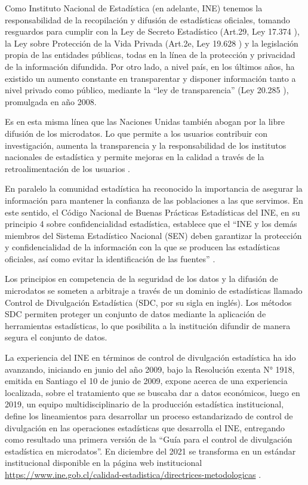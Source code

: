 \documentclass[
]{book}
\theoremstyle{definition}
\theoremstyle{definition}
\theoremstyle{definition}
\theoremstyle{definition}
\theoremstyle{remark}
\begin{document}
Como Instituto Nacional de Estadística (en adelante, INE) tenemos la responsabilidad de la recopilación y difusión de estadísticas oficiales, tomando resguardos para cumplir con la Ley de Secreto Estadístico (Art.29, Ley 17.374 \citep{ley1970}), la Ley sobre Protección de la Vida Privada (Art.2e, Ley 19.628 \citep{ley1999}) y la legislación propia de las entidades públicas, todas en la línea de la protección y privacidad de la información difundida. Por otro lado, a nivel país, en los últimos años, ha existido un aumento constante en transparentar y disponer información tanto a nivel privado como público, mediante la ``ley de transparencia'' (Ley 20.285 \citep{ley2008}), promulgada en año 2008.

Es en esta misma línea que las Naciones Unidas también abogan por la libre difusión de los microdatos. Lo que permite a los usuarios contribuir con investigación, aumenta la transparencia y la responsabilidad de los institutos nacionales de estadística y permite mejoras en la calidad a través de la retroalimentación de los usuarios \citep{nacionesunidas}.

En paralelo la comunidad estadística ha reconocido la importancia de asegurar la información para mantener la confianza de las poblaciones a las que servimos. En este sentido, el Código Nacional de Buenas Prácticas Estadísticas del INE, en su principio 4 sobre confidencialidad estadística, establece que el ``INE y los demás miembros del Sistema Estadístico Nacional (SEN) deben garantizar la protección y confidencialidad de la información con la que se producen las estadísticas oficiales, así como evitar la identificación de las fuentes'' \citep{institutonacionaldeestadisticas2015}.

Los principios en competencia de la seguridad de los datos y la difusión de microdatos se someten a arbitraje a través de un dominio de estadísticas llamado Control de Divulgación Estadística (SDC, por su sigla en inglés). Los métodos SDC permiten proteger un conjunto de datos mediante la aplicación de herramientas estadísticas, lo que posibilita a la institución difundir de manera segura el conjunto de datos.

La experiencia del INE en términos de control de divulgación estadística ha ido avanzando, iniciando en junio del año 2009, bajo la Resolución exenta N° 1918, emitida en Santiago el 10 de junio de 2009, expone acerca de una experiencia localizada, sobre el tratamiento que se buscaba dar a datos económicos, luego en 2019, un equipo multidisciplinario de la producción estadística institucional, define los lineamientos para desarrollar un proceso estandarizado de control de divulgación en las operaciones estadísticas que desarrolla el INE, entregando como resultado una primera versión de la ``Guía para el control de divulgación estadística en microdatos''. En diciembre del 2021 se transforma en un estándar institucional disponible en la página web institucional \url{https://www.ine.gob.cl/calidad-estadistica/directrices-metodologicas} \citep{institutonacionaldeestadisticas2021}.
\end{document}
